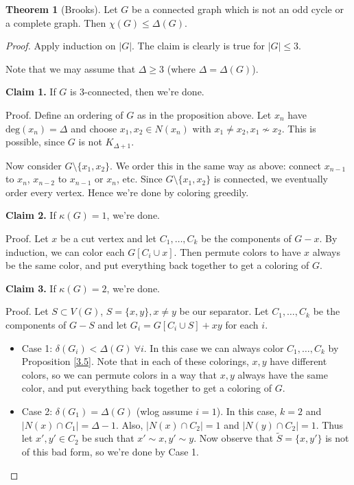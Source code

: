 \documentclass{article}
\theoremstyle{definition}
\newtheorem{theorem}{Theorem}[section]
\begin{document}
\begin{theorem}[Brooks]
    Let $G$ be a connected graph which is not an odd cycle or a complete graph. Then $\chi(G)\le \Delta(G)$.
\end{theorem}
\begin{proof}
    Apply induction on $|G|$. The claim is clearly is true for $|G|\le 3$. 

    Note that we may assume that $\Delta\ge 3$ (where $\Delta=\Delta(G)$).
    \vspace{1mm}
    
    \textbf{Claim 1.} If $G$ is 3-connected, then we're done.
    \vspace{1mm}
    
    Proof. Define an ordering of $G$ as in the proposition above. Let $x_n$ have $\text{deg}(x_n) = \Delta$ and choose $x_1,x_2 \in N(x_n)$ with $x_1 \neq x_2, x_1 \not\sim x_2$. This is possible, since $G$ is not $K_{\Delta+1}$.

    Now consider $G \setminus \{x_1,x_2\}$. We order this in the same way as above: connect $x_{n-1}$ to $x_n$, $x_{n-2}$ to $x_{n-1}$ or $x_n$, etc. Since $G\setminus \{x_1,x_2\}$ is connected, we eventually order every vertex. Hence we're done by coloring greedily.
    \vspace{1mm}
    
    \textbf{Claim 2.} If $\kappa(G)=1$, we're done.
    \vspace{1mm}
    
    Proof. Let $x$ be a cut vertex and let $C_1,\ldots,C_k$ be the components of $G-x$. By induction, we can color each $G[C_i \cup x]$. Then permute colors to have $x$ always be the same color, and put everything back together to get a coloring of $G$.

    \vspace{1mm}
    
    \textbf{Claim 3.} If $\kappa(G)=2$, we're done.
    \vspace{1mm}
    
    Proof. Let $S \subset V(G)$, $S=\{x,y\}, x\neq y$ be our separator. Let $C_1,\ldots,C_k$ be the components of $G-S$ and let $G_i = G[C_i \cup S]+xy$ for each $i$.
    \begin{itemize}
        \item Case 1: $\delta(G_i)<\Delta(G) ~\forall i$. In this case we can always color $C_1,\ldots,C_k$ by Proposition \ref{3.5}. Note that in each of these colorings, $x,y$ have different colors, so we can permute colors in a way that $x,y$ always have the same color, and put everything back together to get a coloring of $G$.
        \item Case 2: $\delta(G_1)=\Delta(G)$ (wlog assume $i=1$). In this case, $k=2$ and $|N(x) \cap C_1| = \Delta-1$. Also, $|N(x) \cap C_2|=1$ and $|N(y) \cap C_2|=1$. Thus let $x', y' \in C_2$ be such that $x'\sim x, y'\sim y$. Now observe that $\tilde{S}=\{x,y'\}$ is not of this bad form, so we're done by Case 1.
    \end{itemize}
\end{proof}
\end{document}
